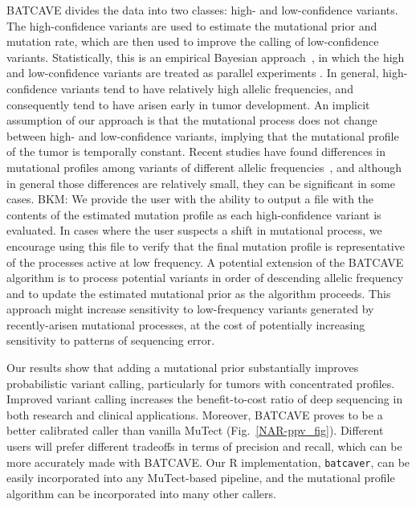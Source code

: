 \documentclass[a4,center,fleqn]{NAR}
\newcommand{\bkmcomment}[1]{{\color{blue}BKM: #1}}
\newcommand{\batcave}{BATCAVE\xspace}
\begin{document}
\batcave divides the data into two classes: high- and low-confidence variants.
The high-confidence variants are used to estimate the mutational prior and mutation rate, which are then used to improve the calling of low-confidence variants.
Statistically, this is an empirical Bayesian approach~\cite{Robbins1954}, in which the high and low-confidence variants are treated as parallel experiments \cite{Morris1983,Efron2014}. 
In general, high-confidence variants tend to have relatively high allelic frequencies, and consequently tend to have arisen early in tumor development.
An  implicit assumption of our approach is that the mutational process does not change between high- and low-confidence variants, implying that the mutational profile of the tumor is temporally constant.
Recent studies have found differences in mutational profiles among variants of different allelic frequencies~\cite{Rubanova2018a}, and although in general those differences are relatively small, they can be significant in some cases.
\bkmcomment{We provide the user with the ability to output a file with the contents of the estimated mutation profile as each high-confidence variant is evaluated.
In cases where the user suspects a shift in mutational process, we encourage using this file to verify that the final mutation profile is representative of the processes active at low frequency.}
A potential extension of the \batcave algorithm is to process potential variants in order of descending allelic frequency and to update the estimated mutational prior as the algorithm proceeds.
This approach might increase sensitivity to low-frequency variants generated by recently-arisen mutational processes, at the cost of potentially increasing sensitivity to patterns of sequencing error.

Our results show that adding a mutational prior substantially improves probabilistic variant calling, particularly for tumors with concentrated profiles.
Improved variant calling increases the benefit-to-cost ratio of deep sequencing in both research and clinical applications.
Moreover, \batcave proves to be a better calibrated caller than vanilla MuTect (Fig.~\ref{NAR-ppv_fig}).
Different users will prefer different tradeoffs in terms of precision and recall, which can be more accurately made with \batcave.
Our R implementation, \texttt{batcaver}, can be easily incorporated into any MuTect-based pipeline, and the mutational profile algorithm can be incorporated into many other callers.

\end{document}

